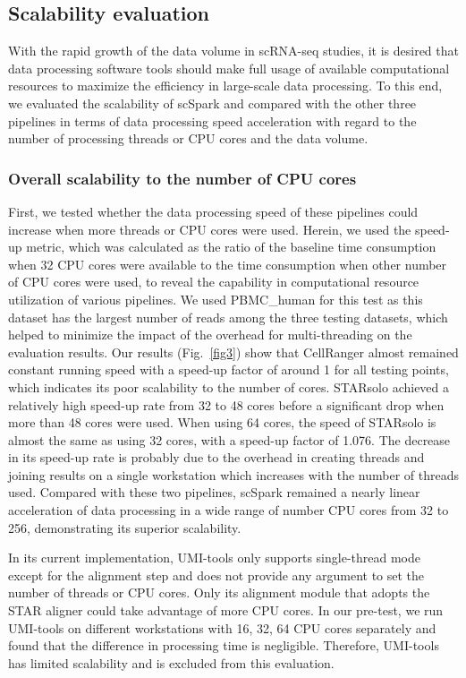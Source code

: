 \documentclass[conference]{IEEEtran}
\begin{document}
\subsection{Scalability evaluation}
With the rapid growth of the data volume in scRNA-seq studies, it is desired that data processing software tools should make full usage of available computational resources to maximize the efficiency in large-scale data processing. To this end, we evaluated the scalability of scSpark and compared with the other three pipelines in terms of data processing speed acceleration with regard to the number of processing threads or CPU cores and the data volume.

\subsubsection{Overall scalability to the number of CPU cores}
First, we tested whether the data processing speed of these pipelines could increase when more threads or CPU cores were used. Herein, we used the speed-up metric, which was calculated as the ratio of the baseline time consumption when 32 CPU cores were available to the time consumption when other number of CPU cores were used, to reveal the capability in computational resource utilization of various pipelines. 
We used PBMC\_human for this test as this dataset has the largest number of reads among the three testing datasets, which helped to minimize the impact of the overhead for multi-threading on the evaluation results. 
Our results (Fig.~\ref{fig3}) show that CellRanger almost remained constant running speed with a speed-up factor of around 1 for all testing points, which indicates its poor scalability to the number of cores. 
STARsolo achieved a relatively high speed-up rate from 32 to 48 cores before a significant drop when more than 48 cores were used. When using 64 cores, the speed of STARsolo is almost the same as using 32 cores, with a speed-up factor of 1.076. 
The decrease in its speed-up rate is probably due to the overhead in creating threads and joining results on a single workstation which increases with the number of threads used. 
Compared with these two pipelines, scSpark remained a nearly linear acceleration of data processing in a wide range of number CPU cores from 32 to 256, demonstrating its superior scalability. 

In its current implementation, UMI-tools only supports single-thread mode except for the alignment step and does not provide any argument to set the number of threads or CPU cores. Only its alignment module that adopts the STAR aligner could take advantage of more CPU cores. 
In our pre-test, we run UMI-tools on different workstations with 16, 32, 64 CPU cores separately and found that the difference in processing time is negligible. 
Therefore, UMI-tools has limited scalability and is excluded from this evaluation. 
\end{document}
